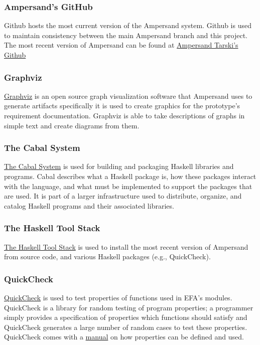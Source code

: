 \documentclass[journal,12pt,onecolumn,draftclsnofoot]{article}
\let\Oldsubsubsection\subsubsection
\renewcommand{\subsubsection}{\FloatBarrier\Oldsubsubsection}
\begin{document}
\subsubsection*{Ampersand's GitHub}\label{Github}
\noindent
Github hosts the most current version of the Ampersand system. Github is used 
to maintain consistency between the main Ampersand branch and this project. The 
most recent version of Ampersand can be found at 
\href{https://github.com/AmpersandTarski}{Ampersand Tarski's Github }


\subsubsection*{Graphviz}
\noindent
\href{http://www.softpedia.com/get/Others/Miscellaneous/Graphviz.shtml}{Graphviz}
 is an open source graph visualization software that Ampersand uses to generate 
 artifacts specifically it is used to create graphics for the prototype's 
 requirement documentation. Graphviz is able to take descriptions of graphs in 
 simple text and create diagrams from them. 

\subsubsection*{The Cabal System}

 
\noindent
\href{https://www.haskell.org/cabal/}{The Cabal System} is used for building 
and packaging Haskell libraries and programs. 
Cabal describes what a Haskell package is, how these packages interact with the 
language, and what must be implemented to support the packages that are used. 
It is part of a larger infrastructure used to distribute, organize, and catalog 
Haskell programs and their associated libraries. \cite{hackage}

\subsubsection*{The Haskell Tool Stack}
\noindent
\href{https://www.haskell.org/cabal/}{The Haskell Tool Stack} is used to 
install the most recent version of Ampersand from source code, and various 
Haskell packages (e.g., QuickCheck).

\subsubsection*{QuickCheck}
\noindent
\href{https://hackage.haskell.org/package/QuickCheck}{QuickCheck} is used to 
test properties of functions used in EFA's modules. QuickCheck is a library for 
random testing of program properties; a programmer simply provides a 
specification of properties which functions should satisfy
and QuickCheck generates a large number of random cases to test these properties.
QuickCheck comes with a
\href{http://www.cse.chalmers.se/~rjmh/QuickCheck/manual.html}{manual} on how 
properties can be defined and used. 
\end{document}
